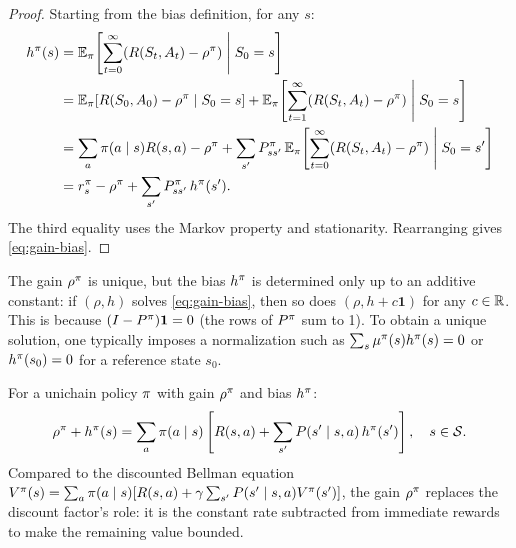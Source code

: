 \documentclass[11pt,a4paper]{article}
\begin{document}
\begin{proof}
Starting from the bias definition, for any $s$:
\begin{align*}
    h^\pi(s)
    &= \mathbb{E}_\pi\!\left[
    \sum_{t=0}^{\infty} (R(S_t, A_t) - \rho^\pi)
    \;\middle|\; S_0 = s \right] \\
    &= \mathbb{E}_\pi[R(S_0, A_0) - \rho^\pi \mid S_0 = s]
    + \mathbb{E}_\pi\!\left[
    \sum_{t=1}^{\infty} (R(S_t, A_t) - \rho^\pi)
    \;\middle|\; S_0 = s \right] \\
    &= \sum_a \pi(a \mid s) R(s,a) - \rho^\pi
    + \sum_{s'} P^\pi_{ss'}\,
    \mathbb{E}_\pi\!\left[
    \sum_{t=0}^{\infty} (R(S_t, A_t) - \rho^\pi)
    \;\middle|\; S_0 = s' \right] \\
    &= r^\pi_s - \rho^\pi
    + \sum_{s'} P^\pi_{ss'}\, h^\pi(s').
\end{align*}
The third equality uses the Markov property and stationarity.
Rearranging gives \eqref{eq:gain-bias}.
\end{proof}

\begin{remark}
\label{rem:bias-uniqueness}
The gain $\rho^\pi$ is unique, but the bias $h^\pi$ is
determined only up to an additive constant: if $({\rho}, h)$
solves \eqref{eq:gain-bias}, then so does $({\rho}, h + c\mathbf{1})$
for any $c \in \mathbb{R}$. This is because $(I - P^\pi)\mathbf{1} = 0$
(the rows of $P^\pi$ sum to 1). To obtain a unique solution, one
typically imposes a normalization such as
$\sum_s \mu^\pi(s) h^\pi(s) = 0$ or $h^\pi(s_0) = 0$
for a reference state $s_0$.
\end{remark}

\begin{keyresult}[title={Gain-Bias Equations (Poisson Equations)}]
For a unichain policy $\pi$ with gain $\rho^\pi$ and bias
$h^\pi$:
\[
    \rho^\pi + h^\pi(s)
    = \sum_a \pi(a \mid s) \left[ R(s,a) + \sum_{s'}
    P(s' \mid s,a)\, h^\pi(s') \right],
    \quad s \in \mathcal{S}.
\]
Compared to the discounted Bellman equation
$V^{\pi}(s) = \sum_a \pi(a \mid s)[R(s,a) + \gamma \sum_{s'}
P(s' \mid s,a) V^{\pi}(s')]$, the gain $\rho^\pi$ replaces
the discount factor's role: it is the constant rate subtracted from
immediate rewards to make the remaining value bounded.
\end{keyresult}
\end{document}
